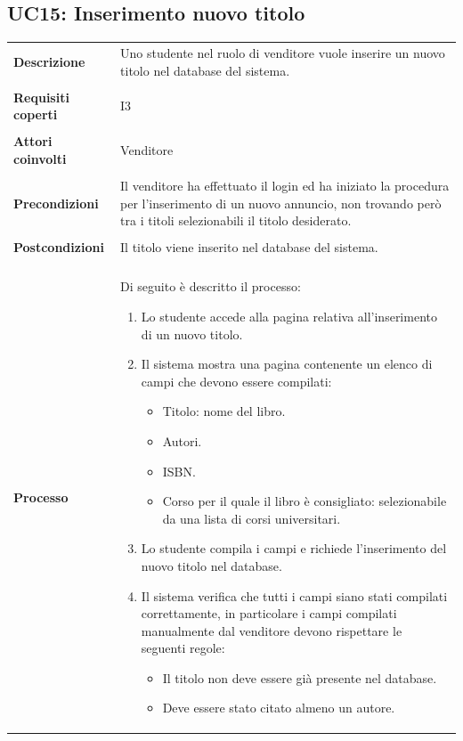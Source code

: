 \documentclass[10pt,a4paper]{report}
\begin{document}
	\subsection{UC15: Inserimento nuovo titolo}
	\begin{tabular}{lp{}}
		\textbf{Descrizione}&Uno studente nel ruolo di venditore vuole inserire un nuovo titolo nel database del sistema.\\
		\\
		\textbf{Requisiti coperti}&I3\\
		\\
		\textbf{Attori coinvolti}&Venditore\\
		\\
		\textbf{Precondizioni}&Il venditore ha effettuato il login ed ha iniziato la procedura per l'inserimento di un nuovo annuncio, non trovando però tra i titoli selezionabili il titolo desiderato.\\
		\\
		\textbf{Postcondizioni}&Il titolo viene inserito nel database del sistema.\\
		\\
		\textbf{Processo}&Di seguito è descritto il processo:
		\begin{enumerate}
			\item Lo studente accede alla pagina relativa all'inserimento di un nuovo titolo.
			\item Il sistema mostra una pagina contenente un elenco di campi che devono essere compilati:
			\begin{itemize}
				\item Titolo: nome del libro.
				\item Autori.
				\item ISBN.
				\item Corso per il quale il libro è consigliato: selezionabile da una lista di corsi universitari.
			\end{itemize}
			\item Lo studente compila i campi e richiede l'inserimento del nuovo titolo nel database.
			\item Il sistema verifica che tutti i campi siano stati compilati correttamente, in particolare i campi compilati manualmente dal venditore devono rispettare le seguenti regole:
			\begin{itemize}
				\item Il titolo non deve essere già presente nel database.
				\item Deve essere stato citato almeno un autore.

\end{itemize}
\end{enumerate}
\end{tabular}
\end{document}
